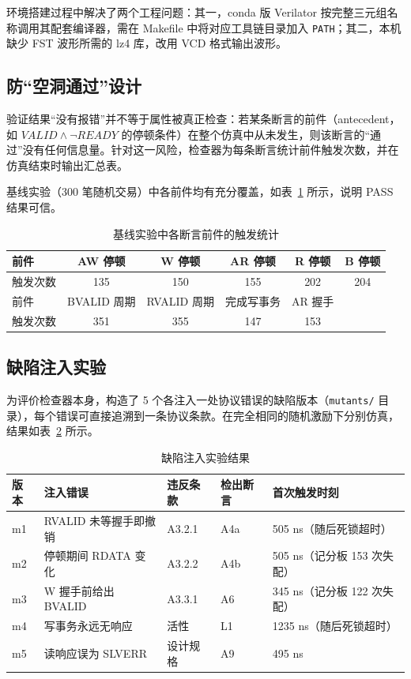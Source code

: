 \documentclass[12pt, a4paper, oneside]{ctexart}
\begin{document}
环境搭建过程中解决了两个工程问题：其一，conda 版 Verilator 按完整三元组名称调用其配套编译器，需在 Makefile 中将对应工具链目录加入 \texttt{PATH}；其二，本机缺少 FST 波形所需的 lz4 库，改用 VCD 格式输出波形。

\subsection{防``空洞通过''设计}

验证结果``没有报错''并不等于属性被真正检查：若某条断言的前件（antecedent，如 $VALID \land \lnot READY$ 的停顿条件）在整个仿真中从未发生，则该断言的``通过''没有任何信息量。针对这一风险，检查器为每条断言统计前件触发次数，并在仿真结束时输出汇总表。

基线实验（300 笔随机交易）中各前件均有充分覆盖，如表~\ref{tab:coverage} 所示，说明 PASS 结果可信。

\begin{table}[H]
\centering
\caption{基线实验中各断言前件的触发统计}
\label{tab:coverage}
\begin{tabular}{lccccc}
\toprule
前件 & AW 停顿 & W 停顿 & AR 停顿 & R 停顿 & B 停顿 \\
\midrule
触发次数 & 135 & 150 & 155 & 202 & 204 \\
\midrule
前件 & BVALID 周期 & RVALID 周期 & 完成写事务 & AR 握手 & \\
\midrule
触发次数 & 351 & 355 & 147 & 153 & \\
\bottomrule
\end{tabular}
\end{table}

\subsection{缺陷注入实验}

为评价检查器本身，构造了 5 个各注入一处协议错误的缺陷版本（\texttt{mutants/} 目录），每个错误可直接追溯到一条协议条款。在完全相同的随机激励下分别仿真，结果如表~\ref{tab:mutants} 所示。

\begin{table}[H]
\centering
\caption{缺陷注入实验结果}
\label{tab:mutants}
\begin{tabularx}{\textwidth}{lXlll}
\toprule
版本 & 注入错误 & 违反条款 & 检出断言 & 首次触发时刻 \\
\midrule
m1 & RVALID 未等握手即撤销 & A3.2.1 & A4a & 505 ns（随后死锁超时） \\
m2 & 停顿期间 RDATA 变化 & A3.2.2 & A4b & 505 ns（记分板 153 次失配） \\
m3 & W 握手前给出 BVALID & A3.3.1 & A6 & 345 ns（记分板 122 次失配） \\
m4 & 写事务永远无响应 & 活性 & L1 & 1235 ns（随后死锁超时） \\
m5 & 读响应误为 SLVERR & 设计规格 & A9 & 495 ns \\
\bottomrule
\end{tabularx}
\end{table}
\end{document}

